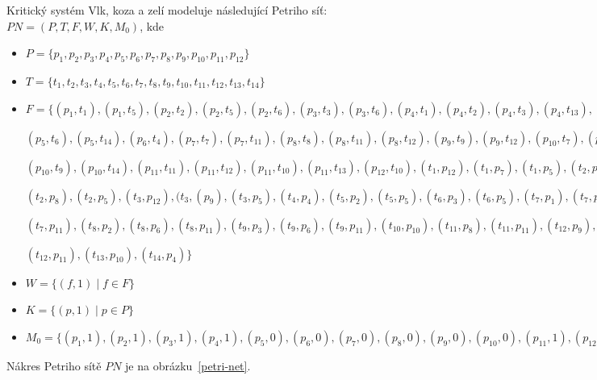 \documentclass[11pt, a4paper, titlepage]{article}
\begin{document}
Kritický systém Vlk, koza a zelí modeluje následující Petriho síť: $PN = (P, T, F, W, K, M_0)$, kde

\begin{itemize}[label=$\circ$]
	\item $P = \{ p_1, p_2, p_3, p_4, p_5, p_6, p_7, p_8, p_9, p_{10}, p_{11}, p_{12} \}$
	\item $T = \{ t_1, t_2, t_3, t_4, t_5, t_6, t_7, t_8, t_9, t_{10}, t_{11}, t_{12}, t_{13}, t_{14} \}$
	\item $F = \{ (p_1, t_1), (p_1, t_5), (p_2, t_2), (p_2, t_5), (p_2, t_6), (p_3, t_3), (p_3, t_6), (p_4, t_1), (p_4, t_2), (p_4, t_3), (p_4, t_13), (p_5, t_5),$

	$(p_5, t_6), (p_5, t_14), (p_6, t_4), (p_7, t_7), (p_7, t_{11}), (p_8, t_8), (p_8, t_{11}), (p_8, t_{12}), (p_9, t_9), (p_9, t_{12}), (p_{10}, t_{7}), (p_{10}, t_{8}),$

	$(p_{10}, t_{9}), (p_10, t_14), (p_{11}, t_{11}), (p_{11}, t_{12}), (p_{11}, t_{10}), (p_11, t_13), (p_{12}, t_{10}), (t_{1}, p_{12}), (t_{1}, p_{7}), (t_{1}, p_{5}), (t_{2}, p_{12}),$

	$(t_{2}, p_{8}), (t_{2}, p_{5}), (t_{3}, p_{12}), (t_{3}, (p_{9}), (t_{3}, p_{5}), (t_{4}, p_{4}), (t_{5}, p_{2}), (t_{5}, p_{5}), (t_{6}, p_{3}), (t_{6}, p_{5}), (t_{7}, p_{1}), (t_{7}, p_{6}),$

	$(t_{7}, p_{11}), (t_{8}, p_{2}), (t_{8}, p_{6}), (t_{8}, p_{11}), (t_{9}, p_{3}), (t_{9}, p_{6}), (t_{9}, p_{11}), (t_{10}, p_{10}), (t_{11}, p_{8}), (t_{11}, p_{11}), (t_{12}, p_{9}),$

	$(t_{12}, p_{11}), (t_{13}, p_{10}), (t_{14}, p_{4}) \}$

	\item $W = \{ (f, 1) \mid f \in F \}$

	\item $K = \{ (p, 1) \mid p \in P \}$

	\item $M_0 = \{ (p_1, 1), (p_2, 1), (p_3, 1), (p_4, 1), (p_5, 0), (p_6, 0), (p_7, 0), (p_8, 0), (p_9, 0), (p_{10}, 0), (p_{11}, 1), (p_{12}, 0) \}$
\end{itemize}

Nákres Petriho sítě $PN$ je na obrázku~\ref{petri-net}.
\end{document}
